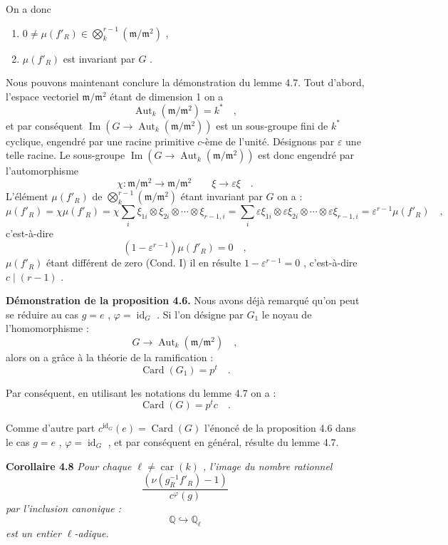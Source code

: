 \documentclass[11pt]{article}
\providecommand{\fm}{\mathfrak{m}}
\newcommand{\car}{\operatorname{car}}
\providecommand{\car}{\operatorname{car}}
\providecommand{\id}{\operatorname{id}}
\providecommand{\id}{\operatorname{id}}
\providecommand{\id}{\operatorname{id}}
\providecommand{\Aut}{\operatorname{Aut}}
\providecommand{\car}{\operatorname{car}}
\providecommand{\id}{\operatorname{id}}
\providecommand{\id}{\operatorname{id}}
\providecommand{\im}{\operatorname{Im}}
\providecommand{\bQ}{\mathbb Q}
\providecommand{\fm}{\mathfrak m}
\providecommand{\im}{\operatorname{im}}
\providecommand{\Aut}{\operatorname{Aut}}
\providecommand{\car}{\operatorname{car}}
\providecommand{\id}{\operatorname{id}}
\begin{document}
On a donc
\begin{enumerate}
\item[1)] $0 \neq \mu(f'_R) \in \bigotimes_k^{r-1}(\fm/\fm^2)$ ,
\item[II)] $\mu(f'_R)$ est
invariant par $G$ .
\end{enumerate}

Nous pouvons maintenant conclure la démonstration du lemme 4.7. Tout d'abord, l'espace vectoriel $\fm/\fm^2$ étant de dimension 1 on a
\[
\Aut_k(\fm/\fm^2) = k^* \quad ,
\]
et par conséquent $\im(G \longrightarrow \Aut_k(\fm/\fm^2))$ est un sous-groupe fini de $k^*$ cyclique, engendré par une racine primitive $c$-ème de l'unité. Désignons par $\varepsilon$ une telle racine. Le sous-groupe $\im(G \longrightarrow \Aut_k(\fm/\fm^2))$ est donc engendré par l'automorphisme
\[
\chi : \fm/\fm^2 \longrightarrow \fm/\fm^2 \quad \quad \xi \longrightarrow \varepsilon\xi \quad .
\]
L'élément $\mu(f'_R)$ de $\bigotimes_k^{r-1}(\fm/\fm^2)$ étant invariant par $G$ on a :
\[
\mu(f'_R) = \chi\mu(f'_R) = \chi\sum_i \xi_{1i} \otimes \xi_{2i} \otimes \cdots \otimes \xi_{r-1,i} = \sum_i \varepsilon\xi_{1i} \otimes \varepsilon\xi_{2i} \otimes \cdots \otimes \varepsilon\xi_{r-1,i} = \varepsilon^{r-1}\mu(f'_R) \quad ,
\]
c'est-à-dire
\[
(1 - \varepsilon^{r-1})\mu(f'_R) = 0 \quad ,
\]
$\mu(f'_R)$ étant différent de zero (Cond. I) il en résulte $1 - \varepsilon^{r-1} = 0$ , c'est-à-dire $c \mid (r-1)$ .

\medskip

\noindent
\textbf{Démonstration de la proposition 4.6.} Nous avons déjà remarqué qu'on peut se réduire au cas $g = e$ , $\varphi = \id_G$ . Si l'on désigne par $G_1$ le noyau de l'homomorphisme :
\[
G \longrightarrow \Aut_k(\fm/\fm^2) \quad ,
\]
alors on a grâce à la théorie de la ramification :
\[
\operatorname{Card}(G_1) = p^t \quad .
\]

Par conséquent, en utilisant les notations du lemme 4.7 on a :
\[
\operatorname{Card}(G) = p^t c \quad .
\]

Comme d'autre part $c^{\id_G}(e) = \operatorname{Card}(G)$ l'énoncé de la proposition 4.6 dans le cas $g = e$ , $\varphi = \id_G$ , et par conséquent en général, résulte du lemme 4.7.

\medskip
\noindent
\textbf{Corollaire 4.8} \emph{Pour chaque $\ell \neq \car(k)$ , l'image du nombre rationnel
\[
\frac{(\nu(g_R^{-1}f'_R) - 1)}{c^\varphi(g)}
\]
par l'inclusion canonique :
\[
\bQ \hookrightarrow \bQ_\ell
\]
est un entier $\ell$-adique.}
\end{document}
